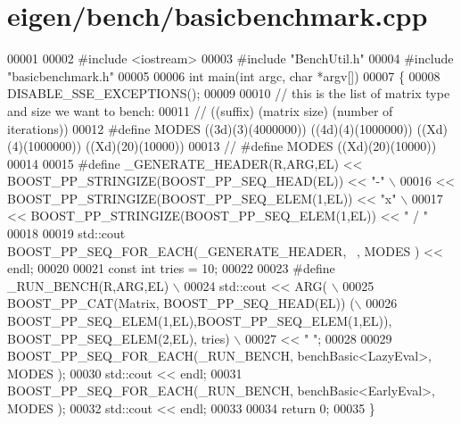\hypertarget{eigen_2bench_2basicbenchmark_8cpp_source}{}\section{eigen/bench/basicbenchmark.cpp}
\label{eigen_2bench_2basicbenchmark_8cpp_source}

\begin{DoxyCode}
00001 
00002 \textcolor{preprocessor}{#include <iostream>}
00003 \textcolor{preprocessor}{#include "BenchUtil.h"}
00004 \textcolor{preprocessor}{#include "basicbenchmark.h"}
00005 
00006 \textcolor{keywordtype}{int} main(\textcolor{keywordtype}{int} argc, \textcolor{keywordtype}{char} *argv[])
00007 \{
00008   DISABLE\_SSE\_EXCEPTIONS();
00009 
00010   \textcolor{comment}{// this is the list of matrix type and size we want to bench:}
00011   \textcolor{comment}{// ((suffix) (matrix size) (number of iterations))}
00012 \textcolor{preprocessor}{  #define MODES ((3d)(3)(4000000)) ((4d)(4)(1000000)) ((Xd)(4)(1000000)) ((Xd)(20)(10000))}
00013 \textcolor{comment}{//   #define MODES ((Xd)(20)(10000))}
00014 
00015 \textcolor{preprocessor}{  #define \_GENERATE\_HEADER(R,ARG,EL) << BOOST\_PP\_STRINGIZE(BOOST\_PP\_SEQ\_HEAD(EL)) << "-" \(\backslash\)}
00016 \textcolor{preprocessor}{    << BOOST\_PP\_STRINGIZE(BOOST\_PP\_SEQ\_ELEM(1,EL)) << "x" \(\backslash\)}
00017 \textcolor{preprocessor}{    << BOOST\_PP\_STRINGIZE(BOOST\_PP\_SEQ\_ELEM(1,EL)) << "   /   "}
00018 
00019   std::cout BOOST\_PP\_SEQ\_FOR\_EACH(\_GENERATE\_HEADER, ~, MODES ) << endl;
00020 
00021   \textcolor{keyword}{const} \textcolor{keywordtype}{int} tries = 10;
00022 
00023 \textcolor{preprocessor}{  #define \_RUN\_BENCH(R,ARG,EL) \(\backslash\)}
00024 \textcolor{preprocessor}{    std::cout << ARG( \(\backslash\)}
00025 \textcolor{preprocessor}{      BOOST\_PP\_CAT(Matrix, BOOST\_PP\_SEQ\_HEAD(EL)) (\(\backslash\)}
00026 \textcolor{preprocessor}{         BOOST\_PP\_SEQ\_ELEM(1,EL),BOOST\_PP\_SEQ\_ELEM(1,EL)), BOOST\_PP\_SEQ\_ELEM(2,EL), tries) \(\backslash\)}
00027 \textcolor{preprocessor}{    << "   ";}
00028 
00029   BOOST\_PP\_SEQ\_FOR\_EACH(\_RUN\_BENCH, benchBasic<LazyEval>, MODES );
00030   std::cout << endl;
00031   BOOST\_PP\_SEQ\_FOR\_EACH(\_RUN\_BENCH, benchBasic<EarlyEval>, MODES );
00032   std::cout << endl;
00033 
00034   \textcolor{keywordflow}{return} 0;
00035 \}
\end{DoxyCode}
